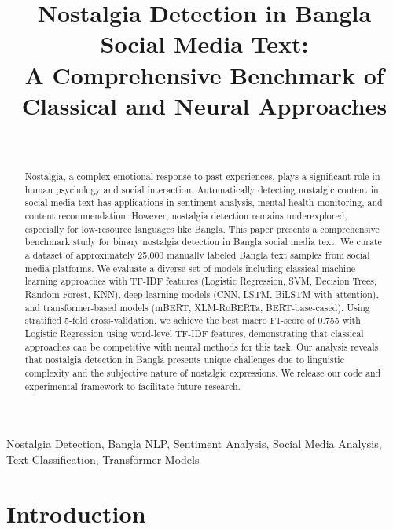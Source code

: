 \documentclass[conference]{IEEEtran}
\begin{document}
\title{Nostalgia Detection in Bangla Social Media Text:\\
A Comprehensive Benchmark of Classical and Neural Approaches}

\author{\\
}

\maketitle

\begin{abstract}
Nostalgia, a complex emotional response to past experiences, plays a significant role in human psychology and social interaction. Automatically detecting nostalgic content in social media text has applications in sentiment analysis, mental health monitoring, and content recommendation. However, nostalgia detection remains underexplored, especially for low-resource languages like Bangla. This paper presents a comprehensive benchmark study for binary nostalgia detection in Bangla social media text. We curate a dataset of approximately 25,000 manually labeled Bangla text samples from social media platforms. We evaluate a diverse set of models including classical machine learning approaches with TF-IDF features (Logistic Regression, SVM, Decision Trees, Random Forest, KNN), deep learning models (CNN, LSTM, BiLSTM with attention), and transformer-based models (mBERT, XLM-RoBERTa, BERT-base-cased). Using stratified 5-fold cross-validation, we achieve the best macro F1-score of 0.755 with Logistic Regression using word-level TF-IDF features, demonstrating that classical approaches can be competitive with neural methods for this task. Our analysis reveals that nostalgia detection in Bangla presents unique challenges due to linguistic complexity and the subjective nature of nostalgic expressions. We release our code and experimental framework to facilitate future research.
\end{abstract}

\begin{IEEEkeywords}
Nostalgia Detection, Bangla NLP, Sentiment Analysis, Social Media Analysis, Text Classification, Transformer Models
\end{IEEEkeywords}

\section{Introduction}
\end{document}

